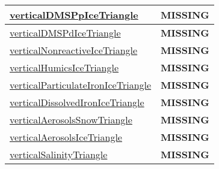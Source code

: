 {\begin{center}
\begin{longtable}{| p{2.0in} | p{4.0in} |}
    \hline
    \hyperref[subsec:var_sec_tracer_triangles_verticalDMSPpIceTriangle]{verticalDMSPpIceTriangle} & {\bf \color{red} MISSING} \\
    \hline
    \hyperref[subsec:var_sec_tracer_triangles_verticalDMSPdIceTriangle]{verticalDMSPdIceTriangle} & {\bf \color{red} MISSING} \\
    \hline
    \hyperref[subsec:var_sec_tracer_triangles_verticalNonreactiveIceTriangle]{verticalNonreactiveIceTriangle} & {\bf \color{red} MISSING} \\
    \hline
    \hyperref[subsec:var_sec_tracer_triangles_verticalHumicsIceTriangle]{verticalHumicsIceTriangle} & {\bf \color{red} MISSING} \\
    \hline
    \hyperref[subsec:var_sec_tracer_triangles_verticalParticulateIronIceTriangle]{verticalParticulateIronIceTriangle} & {\bf \color{red} MISSING} \\
    \hline
    \hyperref[subsec:var_sec_tracer_triangles_verticalDissolvedIronIceTriangle]{verticalDissolvedIronIceTriangle} & {\bf \color{red} MISSING} \\
    \hline
    \hyperref[subsec:var_sec_tracer_triangles_verticalAerosolsSnowTriangle]{verticalAerosolsSnowTriangle} & {\bf \color{red} MISSING} \\
    \hline
    \hyperref[subsec:var_sec_tracer_triangles_verticalAerosolsIceTriangle]{verticalAerosolsIceTriangle} & {\bf \color{red} MISSING} \\
    \hline
    \hyperref[subsec:var_sec_tracer_triangles_verticalSalinityTriangle]{verticalSalinityTriangle} & {\bf \color{red} MISSING} \\
    \hline
\end{longtable}
\end{center}
}

